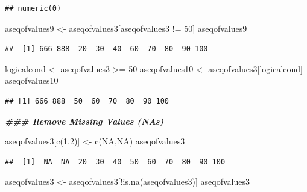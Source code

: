 \documentclass[
]{book}
\newenvironment{Shaded}{\begin{snugshade}}{\end{snugshade}}
\newcommand{\ConstantTok}[1]{\textcolor[rgb]{0.00,0.00,0.00}{#1}}
\newcommand{\DecValTok}[1]{\textcolor[rgb]{0.00,0.00,0.81}{#1}}
\newcommand{\DocumentationTok}[1]{\textcolor[rgb]{0.56,0.35,0.01}{\textbf{\textit{#1}}}}
\newcommand{\FunctionTok}[1]{\textcolor[rgb]{0.00,0.00,0.00}{#1}}
\newcommand{\NormalTok}[1]{#1}
\newcommand{\OtherTok}[1]{\textcolor[rgb]{0.56,0.35,0.01}{#1}}
\newcommand{\SpecialCharTok}[1]{\textcolor[rgb]{0.00,0.00,0.00}{#1}}
\begin{document}
\begin{verbatim}
## numeric(0)
\end{verbatim}

\begin{Shaded}
\begin{Highlighting}[]
\NormalTok{aseqofvalues9 }\OtherTok{\textless{}{-}}\NormalTok{ aseqofvalues3[aseqofvalues3 }\SpecialCharTok{!=} \DecValTok{50}\NormalTok{]}
\NormalTok{aseqofvalues9}
\end{Highlighting}
\end{Shaded}

\begin{verbatim}
##  [1] 666 888  20  30  40  60  70  80  90 100
\end{verbatim}

\begin{Shaded}
\begin{Highlighting}[]
\NormalTok{logicalcond }\OtherTok{\textless{}{-}}\NormalTok{ aseqofvalues3 }\SpecialCharTok{\textgreater{}=} \DecValTok{50}
\NormalTok{aseqofvalues10 }\OtherTok{\textless{}{-}}\NormalTok{ aseqofvalues3[logicalcond]}
\NormalTok{aseqofvalues10}
\end{Highlighting}
\end{Shaded}

\begin{verbatim}
## [1] 666 888  50  60  70  80  90 100
\end{verbatim}

\begin{Shaded}
\begin{Highlighting}[]
\DocumentationTok{\#\#\# Remove Missing Values (NAs)}

\NormalTok{aseqofvalues3[}\FunctionTok{c}\NormalTok{(}\DecValTok{1}\NormalTok{,}\DecValTok{2}\NormalTok{)] }\OtherTok{\textless{}{-}} \FunctionTok{c}\NormalTok{(}\ConstantTok{NA}\NormalTok{,}\ConstantTok{NA}\NormalTok{)}
\NormalTok{aseqofvalues3}
\end{Highlighting}
\end{Shaded}

\begin{verbatim}
##  [1]  NA  NA  20  30  40  50  60  70  80  90 100
\end{verbatim}

\begin{Shaded}
\begin{Highlighting}[]
\NormalTok{aseqofvalues3 }\OtherTok{\textless{}{-}}\NormalTok{ aseqofvalues3[}\SpecialCharTok{!}\FunctionTok{is.na}\NormalTok{(aseqofvalues3)]}
\NormalTok{aseqofvalues3}
\end{Highlighting}
\end{Shaded}
\end{document}
